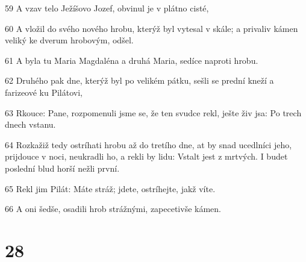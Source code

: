 \par 59 A vzav telo Ježíšovo Jozef, obvinul je v plátno cisté,
\par 60 A vložil do svého nového hrobu, kterýž byl vytesal v skále; a privaliv kámen veliký ke dverum hrobovým, odšel.
\par 61 A byla tu Maria Magdaléna a druhá Maria, sedíce naproti hrobu.
\par 62 Druhého pak dne, kterýž byl po velikém pátku, sešli se prední kneží a farizeové ku Pilátovi,
\par 63 Rkouce: Pane, rozpomenuli jsme se, že ten svudce rekl, ješte živ jsa: Po trech dnech vstanu.
\par 64 Rozkažiž tedy ostríhati hrobu až do tretího dne, at by snad ucedlníci jeho, prijdouce v noci, neukradli ho, a rekli by lidu: Vstalt jest z mrtvých. I budet poslední blud horší nežli první.
\par 65 Rekl jim Pilát: Máte stráž; jdete, ostríhejte, jakž víte.
\par 66 A oni šedše, osadili hrob strážnými, zapecetivše kámen.

\chapter{28}

